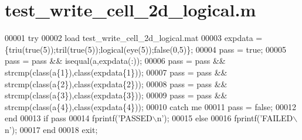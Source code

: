 \hypertarget{test__write__cell__2d__logical_8m_source}{}\section{test\+\_\+write\+\_\+cell\+\_\+2d\+\_\+logical.\+m}
\label{test__write__cell__2d__logical_8m_source}

\begin{DoxyCode}
00001 \textcolor{keywordflow}{try}
00002     load test\_write\_cell\_2d\_logical.mat
00003     expdata = \{triu(\textcolor{keyword}{true}(5));tril(\textcolor{keyword}{true}(5));logical(eye(5));\textcolor{keyword}{false}(0,5)\};
00004     pass = \textcolor{keyword}{true};
00005     pass = pass && isequal(a,expdata(:));
00006     pass = pass && strcmp(\textcolor{keyword}{class}(a\{1\}),\textcolor{keyword}{class}(expdata\{1\}));
00007     pass = pass && strcmp(\textcolor{keyword}{class}(a\{2\}),\textcolor{keyword}{class}(expdata\{2\}));
00008     pass = pass && strcmp(\textcolor{keyword}{class}(a\{3\}),\textcolor{keyword}{class}(expdata\{3\}));
00009     pass = pass && strcmp(\textcolor{keyword}{class}(a\{4\}),\textcolor{keyword}{class}(expdata\{4\}));
00010 \textcolor{keywordflow}{catch} me
00011     pass = \textcolor{keyword}{false};
00012 end
00013 \textcolor{keywordflow}{if} pass
00014     fprintf(\textcolor{stringliteral}{'PASSED\(\backslash\)n'});
00015 \textcolor{keywordflow}{else}
00016     fprintf(\textcolor{stringliteral}{'FAILED\(\backslash\)n'});
00017 end
00018 exit;
\end{DoxyCode}
